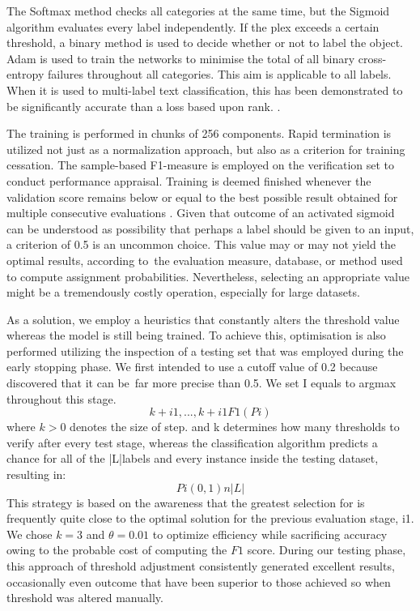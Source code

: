 \documentclass[a4paper]{article}
\begin{document}
The Softmax method checks all categories at the same time, but the Sigmoid algorithm evaluates every label independently. If the plex exceeds a certain threshold, a binary method is used to decide whether or not to label the object. Adam is used to \cite{anderson83} train the networks to minimise the total of all binary cross-entropy failures throughout all categories. This aim is applicable to all labels. When it is used to multi-label text classification, this has been demonstrated to be significantly accurate than a loss based upon rank. \cite{nishioka2016profiling} \cite{blei2003latent}.

The training is performed in chunks of 256 components. Rapid termination is utilized not just as a normalization approach, but also as a criterion for training cessation. The sample-based F1-measure is employed on the verification set to conduct performance appraisal. Training is deemed finished whenever the validation score remains below or equal to the best possible result obtained for multiple consecutive evaluations \cite{collins2002discriminative}. Given that outcome of an activated sigmoid can be understood as possibility that perhaps a label should be given to an input, a criterion of 0.5 is an uncommon choice. This value may or may not yield the optimal results, according to the evaluation measure, database, or method used to compute assignment probabilities. Nevertheless, selecting an appropriate value might be a tremendously costly operation, especially for large datasets.

As a solution, we employ a heuristics that constantly alters the threshold value whereas the model is still being trained. To achieve this, optimisation is also performed utilizing the inspection of a testing set that was employed during the early stopping phase. We first intended to use a cutoff value of 0.2 because \cite{zhang20217} discovered that it can be far more precise than 0.5. We set I equals to argmax throughout this stage.
$$
k+i1,...,k+i1F1(Pi)
$$
where $k>0$ denotes the size of step. and k determines how many thresholds to verify after every test stage, whereas the classification algorithm predicts a chance for all of the |L|labels and every instance inside the testing dataset, resulting in:
$$
Pi(0,1)n|L|
$$
This strategy is based on the awareness that the greatest selection for is frequently quite close to the optimal solution for the previous evaluation stage, i1. We chose $k=3$ and $\theta =0.01$ to optimize efficiency while sacrificing accuracy owing to the probable cost of computing the $F1$ score. During our testing phase, this approach of threshold adjustment consistently generated excellent results, occasionally even outcome that have been superior to those achieved so when threshold was altered manually.
\end{document}

